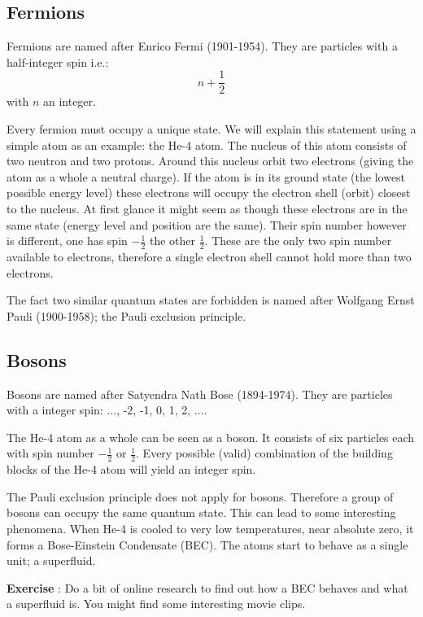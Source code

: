 \subsection{Fermions}
Fermions are named after Enrico Fermi (1901-1954). They are particles with a half-integer spin i.e.:
\begin{equation}
n + \frac{1}{2}
\end{equation}
with $n$ an integer.

Every fermion must occupy a unique state. We will explain this statement using a simple atom as an example: the He-4 atom. The nucleus of this atom consists of two neutron and two protons. Around this nucleus orbit two electrons (giving the atom as a whole a neutral charge). If the atom is in its ground state (the lowest possible energy level) these electrons will occupy the electron shell (orbit) closest to the nucleus. At first glance it might seem as though these electrons are in the same state (energy level and position are the same). Their spin number however is different, one has spin $-\frac{1}{2}$ the other $\frac{1}{2}$. These are the only two spin number available to electrons, therefore a single electron shell cannot hold more than two electrons.

The fact two similar quantum states are forbidden is named after Wolfgang Ernst Pauli (1900-1958); the Pauli exclusion principle.

\subsection{Bosons}
Bosons are named after Satyendra Nath Bose (1894-1974). They are particles with a integer spin: $\ldots$, -2, -1, 0, 1, 2, $\ldots$.

The He-4 atom as a whole can be seen as a boson. It consists of six particles each with spin number $-\frac{1}{2}$ or $\frac{1}{2}$. Every possible (valid) combination of the building blocks of the He-4 atom will yield an integer spin.

The Pauli exclusion principle does not apply for bosons. Therefore a group of bosons can occupy the same quantum state. This can lead to some interesting phenomena. When He-4 is cooled to very low temperatures, near absolute zero, it forms a Bose-Einstein Condensate (BEC). The atoms start to behave as a single unit; a superfluid.

\begin{shaded}
\textbf{Exercise \theExercise {}} : Do a bit of online research to find out how a BEC behaves and what a superfluid is. You might find some interesting movie clips.\end{shaded}

